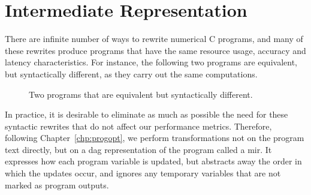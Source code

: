 \section{Intermediate Representation}
\label{lo:sec:intermediate}


There are infinite number of ways to rewrite numerical C programs, and many of
these rewrites produce programs that have the same resource usage, accuracy
and latency characteristics.  For instance, the following two programs
are equivalent, but syntactically different, as they carry out the same
computations.
\begin{figure}[ht]
    \centering
     \qquad \qquad
    \caption{Two programs that are equivalent but syntactically different.}
    \label{lo:fig:equiv_progs}
\end{figure}

In practice, it is desirable to eliminate as much as possible the need
for these syntactic rewrites that do not affect our performance metrics.
Therefore, following Chapter~\ref{chp:progopt}, we perform transformations not
on the program text directly, but on a \gls{dag} representation of the program
called a \gls{mir}\@.  It expresses how each program variable is updated, but
abstracts away the order in which the updates occur, and ignores any temporary
variables that are not marked as program outputs.

